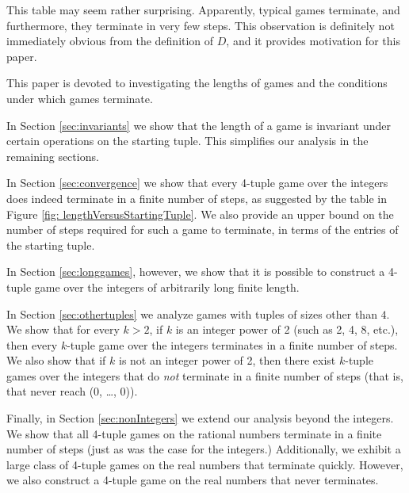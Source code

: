 \documentclass[12pt]{amsart}
\newcommand{\diff}{D}
\begin{document}
This table may seem rather surprising. Apparently, typical games terminate, and furthermore, they terminate in very few steps. This observation is definitely not immediately obvious from the definition of $\diff$, and it provides motivation for this paper.

This paper is devoted to investigating the lengths of games and the conditions under which games terminate. 

%
%
%
%
%

In Section \ref{sec:invariants} we show that the length of a game is invariant under certain operations on the starting tuple. This simplifies our analysis in the remaining sections.

In Section \ref{sec:convergence} we show that every 4-tuple game over the integers does indeed terminate in a finite number of steps, as suggested by the table in Figure \ref{fig: lengthVersusStartingTuple}. We also provide an upper bound on the number of steps required for such a game to terminate, in terms of the entries of the starting tuple.

In Section \ref{sec:longgames}, however, we show that it is possible to construct a 4-tuple game over the integers of arbitrarily long finite length. 

In Section \ref{sec:othertuples} we analyze games with tuples of sizes other than $4$. We show that for every $k > 2$, if $k$ is an integer power of 2 (such as 2, 4, 8, etc.), then every $k$-tuple game over the integers terminates in a finite number of steps. We also show that if $k$ is not an integer power of 2, then there exist $k$-tuple games over the integers that do \textit{not} terminate in a finite number of steps (that is, that never reach (0, \ldots, 0)).

Finally, in Section \ref{sec:nonIntegers} we extend our analysis beyond the integers. We show that all 4-tuple games on the rational numbers terminate in a finite number of steps (just as was the case for the integers.) Additionally, we exhibit a large class of 4-tuple games on the real numbers that terminate quickly. However, we also construct a 4-tuple game on the real numbers that never terminates.
\end{document}
